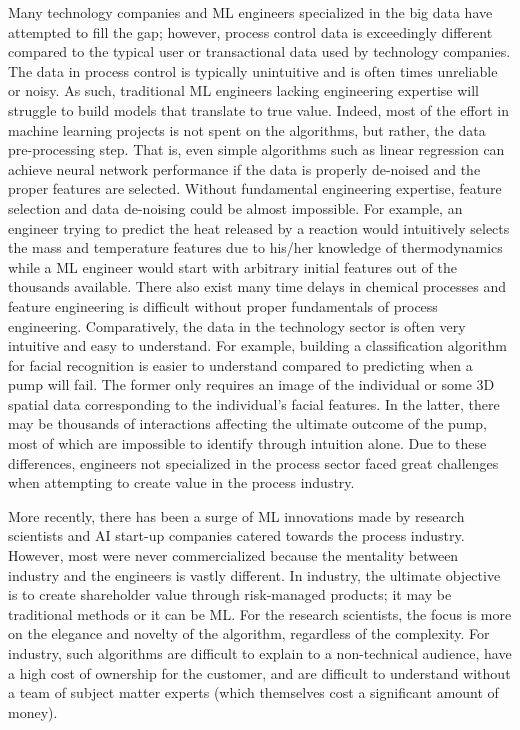 Many technology companies and ML engineers specialized in the big data have attempted to fill the gap; however, process control data is exceedingly different compared to the typical user or transactional data used by technology companies. The data in process control is typically unintuitive and is often times unreliable or noisy. As such, traditional ML engineers lacking engineering expertise will struggle to build models that translate to true value. Indeed, most of the effort in machine learning projects is not spent on the algorithms, but rather, the data pre-processing step.  That is, even simple algorithms such as linear regression can achieve neural network performance if the data is properly de-noised and the proper features are selected. Without fundamental engineering expertise, feature selection and data de-noising could be almost impossible. For example, an engineer trying to predict the heat released by a reaction would intuitively selects the mass and temperature features due to his/her knowledge of thermodynamics while a ML engineer would start with arbitrary initial features out of the thousands available. There also exist many time delays in chemical processes and feature engineering is difficult without proper fundamentals of process engineering. Comparatively, the data in the technology sector is often very intuitive and easy to understand.  For example, building a classification algorithm for facial recognition is easier to understand compared to predicting when a pump will fail.  The former only requires an image of the individual or some 3D spatial data corresponding to the individual's facial features. In the latter, there may be thousands of interactions affecting the ultimate outcome of the pump, most of which are impossible to identify through intuition alone. Due to these differences, engineers not specialized in the process sector faced great challenges when attempting to create value in the process industry.

More recently, there has been a surge of ML innovations made by research scientists and AI start-up companies catered towards the process industry.  However, most were never commercialized because the mentality between industry and the engineers is vastly different.  In industry, the ultimate objective is to create shareholder value through risk-managed products; it may be traditional methods or it can be ML.  For the research scientists, the focus is more on the elegance and novelty of the algorithm, regardless of the complexity. For industry, such algorithms are difficult to explain to a non-technical audience, have a high cost of ownership for the customer, and are difficult to understand without a team of subject matter experts (which themselves cost a significant amount of money).

